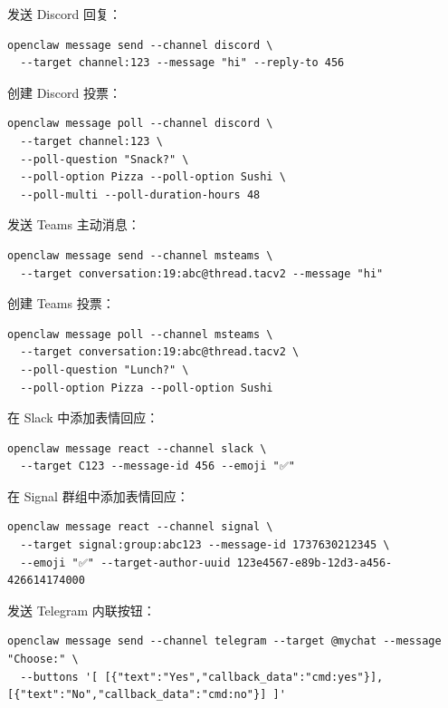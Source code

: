 发送 Discord 回复：

\begin{lstlisting}
openclaw message send --channel discord \
  --target channel:123 --message "hi" --reply-to 456
\end{lstlisting}


创建 Discord 投票：

\begin{lstlisting}
openclaw message poll --channel discord \
  --target channel:123 \
  --poll-question "Snack?" \
  --poll-option Pizza --poll-option Sushi \
  --poll-multi --poll-duration-hours 48
\end{lstlisting}


发送 Teams 主动消息：

\begin{lstlisting}
openclaw message send --channel msteams \
  --target conversation:19:abc@thread.tacv2 --message "hi"
\end{lstlisting}


创建 Teams 投票：

\begin{lstlisting}
openclaw message poll --channel msteams \
  --target conversation:19:abc@thread.tacv2 \
  --poll-question "Lunch?" \
  --poll-option Pizza --poll-option Sushi
\end{lstlisting}


在 Slack 中添加表情回应：

\begin{lstlisting}
openclaw message react --channel slack \
  --target C123 --message-id 456 --emoji "✅"
\end{lstlisting}


在 Signal 群组中添加表情回应：

\begin{lstlisting}
openclaw message react --channel signal \
  --target signal:group:abc123 --message-id 1737630212345 \
  --emoji "✅" --target-author-uuid 123e4567-e89b-12d3-a456-426614174000
\end{lstlisting}


发送 Telegram 内联按钮：

\begin{lstlisting}
openclaw message send --channel telegram --target @mychat --message "Choose:" \
  --buttons '[ [{"text":"Yes","callback_data":"cmd:yes"}], [{"text":"No","callback_data":"cmd:no"}] ]'
\end{lstlisting}



\clearpage

